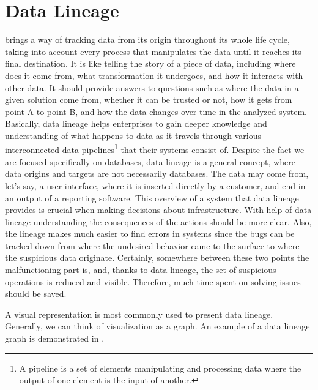 \section{Data Lineage}

 brings a way of tracking data from its origin throughout its whole life cycle, taking into account every process that manipulates the data until it reaches its final destination. 
It is like telling the story of a piece of data, including where does it come from, what transformation it undergoes, and how it interacts with other data.
It should provide answers to questions such as where the data in a given solution come from, whether it can be trusted or not, how it gets from point A to point B, and how the data changes over time in the analyzed system.
Basically, data lineage helps enterprises to gain deeper knowledge and understanding of what happens to data as it travels through various interconnected data pipelines\footnote{A pipeline is a set of elements manipulating and processing data where the output of one element is the input of another.} that their systems consist of. Despite the fact we are focused specifically on databases, data lineage is a general concept, where data origins and targets are not necessarily databases. The data may come from, let's say, a user interface, where it is inserted directly by a customer, and end in an output of a reporting software.
This overview of a system that data lineage provides is crucial when making decisions about infrastructure. With help of data lineage understanding the consequences of the actions should be more clear. Also, the lineage makes much easier to find errors in systems since the bugs can be tracked down from where the undesired behavior came to the surface to where the suspicious data originate. 
Certainly, somewhere between these two points the malfunctioning part is, and, thanks to data lineage, the set of suspicious operations is reduced and visible. 
Therefore, much time spent on solving issues should be saved.

A visual representation is most commonly used to present data lineage. 
Generally, we can think of visualization as a graph. An example of a data lineage graph is demonstrated in .

